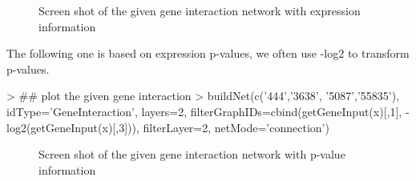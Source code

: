 \documentclass[a4paper]{article}
\begin{document}
\begin{figure}
\centering
\centering
{}
\caption{Screen shot of the given gene interaction network with expression information}
\label{geneInteractionNetwork}
\end{figure}

The following one is based on expression p-values, we often use -log2 to transform p-values.
\begin{Schunk}
\begin{Sinput}
> ## plot the given gene interaction
> buildNet(c('444','3638', '5087','55835'), idType='GeneInteraction', layers=2, filterGraphIDs=cbind(getGeneInput(x)[,1], -log2(getGeneInput(x)[,3])), filterLayer=2, netMode='connection')
\end{Sinput}
\end{Schunk}

\begin{figure}
\centering
\centering
{}
\caption{Screen shot of the given gene interaction network with p-value information}
\label{geneInteractionNetwork}
\end{figure}
\end{document}
